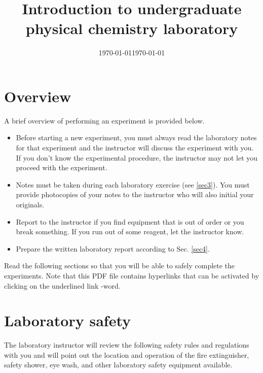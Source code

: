 \documentclass[byrevtex,amssymb,aps,pra,floatfix,letterpaper]{revtex4}
\date{\today}
\begin{document}
\title{Introduction to undergraduate physical chemistry laboratory}

\date{\today}

\maketitle

\section{Overview}
\label{sec1}

A brief overview of performing an experiment is provided below.

\begin{itemize}
\item Before starting a new experiment, you must always read the laboratory notes for that experiment and the instructor will discuss the experiment with you. If you don't know the experimental procedure, the instructor may not let you proceed with the experiment.
\item Notes must be taken during each laboratory exercise (see \ref{sec3}). You must provide photocopies of your notes to the instructor who will also initial your originals.
\item Report to the instructor if you find equipment that is out of order or you break something. If you run out of some reagent, let the instructor know.
\item Prepare the written laboratory report according to Sec. \ref{sec4}.
\end{itemize}

\noindent
Read the following sections so that you will be able to safely complete the experiments. Note that this PDF file contains hyperlinks that can be activated by clicking on the underlined link -word.

\section{Laboratory safety}
\label{sec2}
\noindent
The laboratory instructor will review the following safety rules and regulations with you and will point out the location and operation of the fire extinguisher, safety shower, eye wash, and other laboratory safety equipment available.\\
\end{document}

